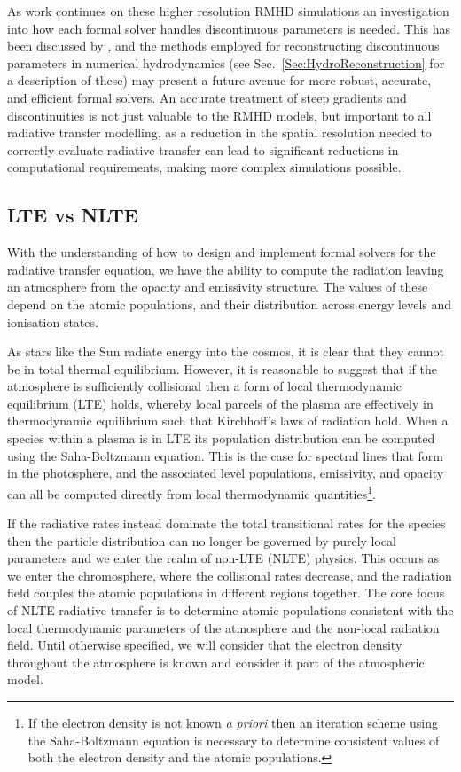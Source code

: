 As work continues on these higher resolution RMHD simulations an investigation into how each formal solver handles discontinuous parameters is needed.
This has been discussed by \citet{Steiner2016}, and the methods employed for reconstructing discontinuous parameters in numerical hydrodynamics (see Sec.~\ref{Sec:HydroReconstruction} for a description of these) may present a future avenue for more robust, accurate, and efficient formal solvers.
An accurate treatment of steep gradients and discontinuities is not just valuable to the RMHD models, but important to all radiative transfer modelling, as a reduction in the spatial resolution needed to correctly evaluate radiative transfer can lead to significant reductions in computational requirements, making more complex simulations possible.


\subsection{LTE vs NLTE}

With the understanding of how to design and implement formal solvers for the radiative transfer equation, we have the ability to compute the radiation leaving an atmosphere from the opacity and emissivity structure.
The values of these depend on the atomic populations, and their distribution across energy levels and ionisation states.

As stars like the Sun radiate energy into the cosmos, it is clear that they cannot be in total thermal equilibrium.
However, it is reasonable to suggest that if the atmosphere is sufficiently collisional then a form of local thermodynamic equilibrium (LTE) holds, whereby local parcels of the plasma are effectively in thermodynamic equilibrium such that Kirchhoff's laws of radiation hold.
When a species within a plasma is in LTE its population distribution can be computed using the Saha-Boltzmann equation.
This is the case for spectral lines that form in the photosphere, and the associated level populations, emissivity, and opacity can all be computed directly from local thermodynamic quantities\footnote{If the electron density is not known \textit{a priori} then an iteration scheme using the Saha-Boltzmann equation is necessary to determine consistent values of both the electron density and the atomic populations.}.

If the radiative rates instead dominate the total transitional rates for the species then the particle distribution can no longer be governed by purely local parameters and we enter the realm of non-LTE (NLTE) physics.
This occurs as we enter the chromosphere, where the collisional rates decrease, and the radiation field couples the atomic populations in different regions together.
The core focus of NLTE radiative transfer is to determine atomic populations consistent with the local thermodynamic parameters of the atmosphere and the non-local radiation field.
Until otherwise specified, we will consider that the electron density throughout the atmosphere is known and consider it part of the atmospheric model.


